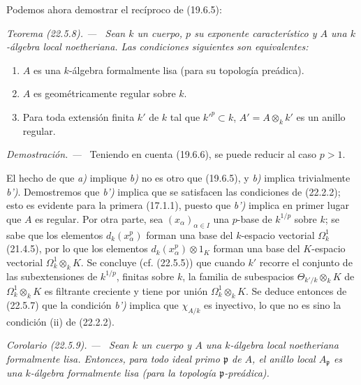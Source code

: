 \documentclass[10pt,oneside]{book}
\makeatletter
\newcommand{\setmanualcurrentlabel}[1]{\def\@currentlabel{#1}}
\newenvironment{theorem}[1][]{%
  \setmanualcurrentlabel{#1}\par\medskip\noindent\itshape Teorema (#1). ---\ }{\par}
\newenvironment{corollary}[1][]{%
  \setmanualcurrentlabel{#1}\par\medskip\noindent\itshape Corolario (#1). ---\ }{\par}
\newenvironment{proof}{%
  \par\medskip\noindent\textit{Demostración. ---\ }}{\par}
\makeatother
\begin{document}
Podemos ahora demostrar el recíproco de (19.6.5):

\begin{theorem}[22.5.8]
\label{0.22.5.8-es}
Sean $k$ un cuerpo, $p$ su exponente característico y $A$ una $k$-álgebra
local noetheriana. Las condiciones siguientes son equivalentes:
\begin{enumerate}
  \item[\textup{a)}] $A$ es una $k$-álgebra formalmente lisa (para su topología
  preádica).
  \item[\textup{b)}] $A$ es geométricamente regular sobre $k$.
  \item[\textup{b')}] Para toda extensión finita $k'$ de $k$ tal que $k'^p\subset k$,
  $A'=A\otimes_kk'$ es un anillo regular.
\end{enumerate}
\end{theorem}

\begin{proof}
Teniendo en cuenta (19.6.6), se puede reducir al caso $p>1$.

El hecho de que \emph{a)} implique \emph{b)} no es otro que (19.6.5), y \emph{b)} implica
trivialmente \emph{b')}. Demostremos que \emph{b')} implica que se satisfacen las condiciones de
(22.2.2); esto es evidente para la primera (17.1.1), puesto que \emph{b')} implica
en primer lugar que $A$ es regular. Por otra parte, sea $(x_\alpha)_{\alpha\in I}$ una
$p$-base de $k^{1/p}$ sobre $k$; se sabe que los elementos $d_k(x_\alpha^p)$
forman una base del $k$-espacio vectorial $\Omega^1_k$ (21.4.5), por lo que los
elementos $d_k(x_\alpha^p)\otimes1_K$ forman una base del $K$-espacio vectorial
$\Omega^1_k\otimes_kK$. Se concluye (cf. (22.5.5)) que cuando $k'$ recorre
el conjunto de las subextensiones de $k^{1/p}$, finitas sobre $k$, la familia de
subespacios $\Theta_{k'/k}\otimes_kK$ de $\Omega^1_k\otimes_kK$ es filtrante
creciente y tiene por unión $\Omega^1_k\otimes_kK$. Se deduce entonces de
(22.5.7) que la condición \emph{b')} implica que $\chi_{A/k}$ es inyectivo, lo que
no es sino la condición (ii) de (22.2.2).
\end{proof}

\begin{corollary}[22.5.9]
\label{0.22.5.9-es}
Sean $k$ un cuerpo y $A$ una $k$-álgebra local noetheriana formalmente
lisa. Entonces, para todo ideal primo $\mathfrak p$ de $A$, el anillo local
$A_{\mathfrak p}$ es una $k$-álgebra formalmente lisa (para la topología
$\mathfrak p$-preádica).
\end{corollary}
\end{document}
